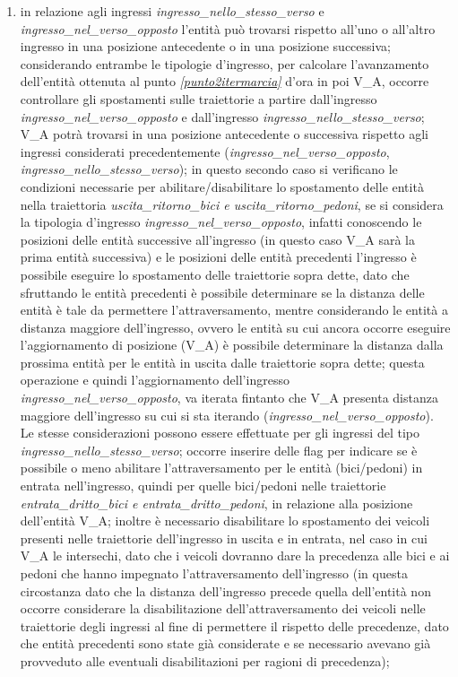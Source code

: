 \begin{enumerate}
\begin{enumerate}
\item in relazione agli ingressi \textit{ingres\-so\_nel\-lo\_stes\-so\_ver\-so} e \textit{ingres\-so\_nel\_ver\-so\_op\-pos\-to} l'entità può trovarsi rispetto all'uno o all'altro ingresso in una posizione antecedente o in una posizione successiva; considerando entrambe le tipologie d'ingresso, per calcolare l'avanzamento dell'entità ottenuta al punto \textit{\ref{punto2itermarcia}} d'ora in poi V\_A, occorre controllare gli spostamenti sulle traiettorie a partire dall'ingresso \textit{ingres\-so\_nel\_ver\-so\_op\-pos\-to} e dall'ingresso \textit{ingres\-so\_nel\-lo\_stes\-so\_ver\-so}; V\_A potrà trovarsi in una posizione antecedente o successiva rispetto agli ingressi considerati precedentemente (\textit{ingres\-so\_nel\_ver\-so\_op\-pos\-to}, \textit{ingres\-so\_nel\-lo\_stes\-so\_ver\-so}); in questo secondo caso si verificano le condizioni necessarie per abilitare/disabilitare lo spostamento delle entità nella traiettoria \textit{usci\-ta\_ri\-tor\-no\_bi\-ci e usci\-ta\_ri\-tor\-no\_pe\-do\-ni}, se si considera la tipologia d'ingresso \textit{ingres\-so\_nel\_ver\-so\_op\-pos\-to}, infatti conoscendo le posizioni delle entità successive all'ingresso (in questo caso V\_A sarà la prima entità successiva) e le posizioni delle entità precedenti l'ingresso è possibile eseguire lo spostamento delle traiettorie sopra dette, dato che sfruttando le entità precedenti è possibile determinare se la distanza delle entità è tale da permettere l'attraversamento, mentre considerando le entità a distanza maggiore dell'ingresso, ovvero le entità su cui ancora occorre eseguire l'aggiornamento di posizione (V\_A) è possibile determinare la distanza dalla prossima entità per le entità in uscita dalle traiettorie sopra dette; questa operazione e quindi l'aggiornamento dell'ingresso \textit{ingres\-so\_nel\_ver\-so\_op\-pos\-to}, va iterata fintanto che V\_A presenta distanza maggiore dell'ingresso su cui si sta iterando (\textit{ingres\-so\_nel\_ver\-so\_op\-pos\-to}). \\
Le stesse considerazioni possono essere effettuate per gli ingressi del tipo \textit{ingres\-so\_nel\-lo\_stes\-so\_ver\-so}; occorre inserire delle flag per indicare se è possibile o meno abilitare l'attraversamento per le entità (bici/pedoni) in entrata nell'ingresso, quindi per quelle bici/pedoni nelle traiettorie \textit{en\-tra\-ta\_drit\-to\_bi\-ci e en\-tra\-ta\_drit\-to\_pe\-do\-ni}, in relazione alla posizione dell'entità V\_A; inoltre è necessario disabilitare lo spostamento dei veicoli presenti nelle traiettorie dell'ingresso in uscita e in entrata, nel caso in cui V\_A le intersechi, dato che i veicoli dovranno dare la precedenza alle bici e ai pedoni che hanno impegnato l'attraversamento dell'ingresso (in questa circostanza dato che la distanza dell'ingresso precede quella dell'entità non occorre considerare la disabilitazione dell'attraversamento dei veicoli nelle traiettorie degli ingressi al fine di permettere il rispetto delle precedenze, dato che entità precedenti sono state già considerate e se necessario avevano già provveduto alle eventuali disabilitazioni per ragioni di precedenza); \\

\end{enumerate}
\end{enumerate}
